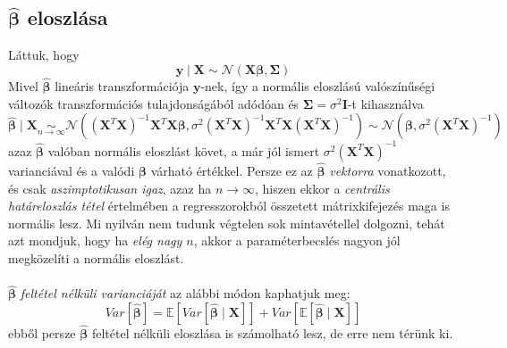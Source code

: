 \documentclass[14p]{report}
\def\pmb{\boldsymbol}
\def\ebeta{\hat{\pmb{\beta}}}
\newcounter{x}
\newcounter{y}
\newcounter{z}
\begin{document}
	\subsection{$\ebeta$ eloszlása}
	Láttuk, hogy
	\[
		\pmb{y} \mid \pmb{X} \sim \mathcal{N}(\pmb{X}\pmb{\beta}, \pmb{\Sigma})
	\]
	Mivel $\ebeta$ lineáris transzformációja $\pmb{y}$-nek, így a normális eloszlású valószínűségi változók transzformációs tulajdonságából adódóan és $\pmb{\Sigma} = \sigma^2\pmb{I}$-t kihasználva
	\[
		\ebeta \mid \pmb{X} \underset{n \rightarrow \infty}{\sim} \mathcal{N}((\pmb{X}^T\pmb{X})^{-1}\pmb{X}^T\pmb{X}\pmb{\beta}, \sigma^2(\pmb{X}^T\pmb{X})^{-1}\pmb{X}^T\pmb{X}(\pmb{X}^T\pmb{X})^{-1}) \sim \mathcal{N}(\pmb{\beta}, \sigma^2(\pmb{X}^T\pmb{X})^{-1})
	\] 
	azaz $\ebeta$ valóban normális eloszlást követ, a már jól ismert $\sigma^2(\pmb{X}^T\pmb{X})^{-1}$ varianciával és a valódi $\pmb{\beta}$ várható értékkel. Persze ez az $\ebeta$ \emph{vektorra} vonatkozott, és csak \emph{aszimptotikusan igaz}, azaz ha $n \rightarrow \infty$, hiszen ekkor a \emph{centrális határeloszlás tétel} értelmében a regresszorokból összetett mátrixkifejezés maga is normális lesz. Mi nyilván nem tudunk végtelen sok mintavétellel dolgozni, tehát azt mondjuk, hogy ha \emph{elég nagy $n$}, akkor a paraméterbecslés nagyon jól megközelíti a normális eloszlást.
	\\
	\\
	$\ebeta$ \emph{feltétel nélküli varianciáját} az alábbi módon kaphatjuk meg:
	\[
		Var[\ebeta] = \mathbb{E}[Var[\ebeta \mid \pmb{X}]] + Var[\mathbb{E}[\ebeta \mid \pmb{X}]]
	\]
	ebből persze $\ebeta$ feltétel nélküli eloszlása is számolható lesz, de erre nem térünk ki.
	
\end{document}
